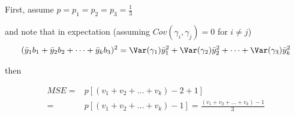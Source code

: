 First, assume $p = p_1 = p_2 = p_3 = \frac{1}{3}$
            
and note that in expectation (assuming $Cov(\gamma_i, \gamma_j) = 0$ for $i \neq j$)
\begin{align*}
	(\bar{y}_1 b_1 + \bar{y}_2 b_2 + \dots + \bar{y}_k b_3 )^2 &= \Var(\gamma_1) \bar{y}_1^2 + \Var(\gamma_2) \bar{y}_2^2 + \dots +\Var(\gamma_3) \bar{y}_k^2 \\
\end{align*}

then

\begin{align*}
	MSE = & p [(v_1 + v_2 + \dots + v_k) - 2 + 1] \\
	= &p[(v_1 + v_2 + \dots + v_k) -1] = \frac{(v_1 + v_2 + \dots + v_k) -1}{3} \\
\end{align*} 
